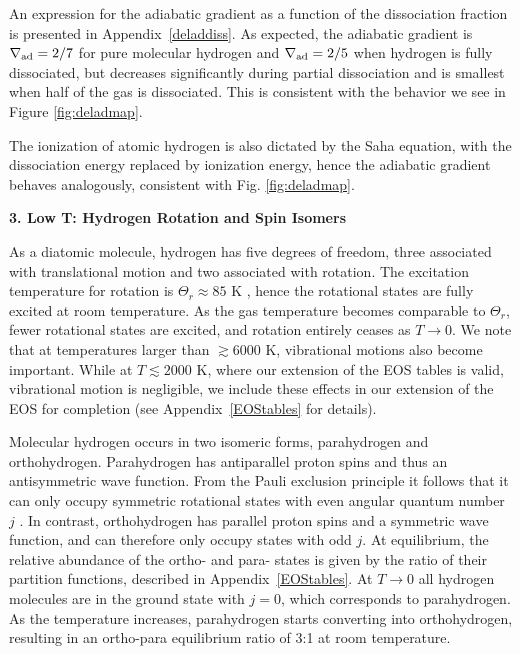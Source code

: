 \documentclass[apj]{emulateapj}
\newcommand{\delad}{\nabla_{\rm ad}}
\newcommand{\App}[1]{Appendix~\ref{#1}}
\begin{document}
An expression for the adiabatic gradient as a function of the dissociation fraction is presented in \App{deladdiss}. As expected, the adiabatic gradient is $\delad=2/7$ for pure molecular hydrogen and $\delad=2/5$ when hydrogen is fully dissociated, but decreases significantly during partial dissociation and is smallest when half of the gas is dissociated. This is consistent with the behavior we see in Figure \ref{fig:deladmap}. 

The ionization of atomic hydrogen is also dictated by the Saha equation, with the dissociation energy replaced by ionization energy, hence the adiabatic gradient behaves analogously, consistent with Fig. \ref{fig:deladmap}.




\vspace{0.2in}

\textbf{3. Low T: Hydrogen Rotation and Spin Isomers}

As a diatomic molecule, hydrogen has five degrees of freedom, three associated with translational motion and two associated with rotation. The excitation temperature for rotation is $\Theta_r \approx 85$ K \citep{kittel}, hence the rotational states are fully excited at room temperature. As the gas temperature becomes comparable to $\Theta_r$, fewer rotational states are excited, and rotation entirely ceases as $T \rightarrow 0$. We note that at temperatures larger than $\gtrsim 6000$ K, vibrational motions also become important. While at $T\lesssim2000$ K, where our extension of the \citet{saumon95} EOS tables is valid, vibrational motion is negligible, we include these effects in our extension of the EOS for completion (see \App{EOStables} for details).

 Molecular hydrogen occurs in two isomeric forms, parahydrogen and orthohydrogen. Parahydrogen has antiparallel proton spins and thus an antisymmetric wave function. From the Pauli exclusion principle it follows that it can only occupy symmetric rotational states with even angular quantum number $j$ \citep{farkas35}. In contrast, orthohydrogen has parallel proton spins and a symmetric wave function, and can therefore only occupy states with odd $j$. At equilibrium, the relative abundance of the ortho- and para- states is given by the ratio of their partition functions, described in \App{EOStables}. At $T \rightarrow 0$ all hydrogen molecules are in the ground state with $j=0$, which corresponds to parahydrogen.  As the temperature increases, parahydrogen starts converting into orthohydrogen, resulting in an ortho-para equilibrium ratio of 3:1 at room temperature.
 
\end{document}
